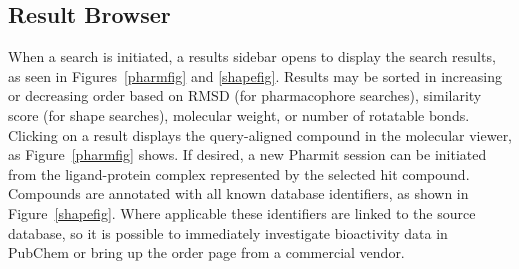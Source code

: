 \subsection{Result Browser}
When a search is initiated, a results sidebar opens to display the search results, as seen in Figures~\ref{pharmfig} and \ref{shapefig}. Results may be sorted in increasing or decreasing order based on RMSD (for pharmacophore searches), similarity score (for shape searches), molecular weight, or number of rotatable bonds. Clicking on a result displays the query-aligned compound in the molecular viewer, as Figure~\ref{pharmfig} shows.  If desired, a new Pharmit session can be initiated from the ligand-protein complex represented by the selected hit compound.
Compounds are annotated with all known database identifiers, as shown in Figure~\ref{shapefig}. Where applicable these identifiers are linked to the source database, so it is possible to immediately investigate bioactivity data in PubChem or bring up the order page from a commercial vendor.